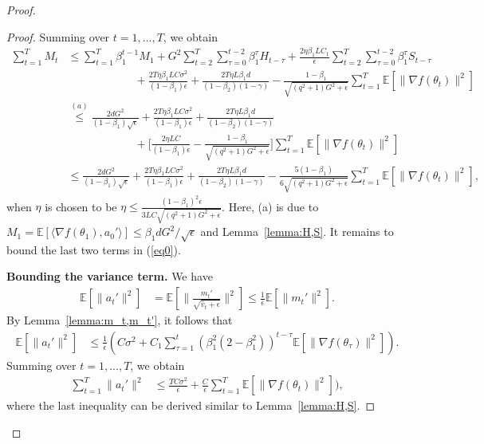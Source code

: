 \documentclass[11pt]{article}
\begin{document}
\begin{proof}
\begin{proof}
Summing over $t=1,...,T$, we obtain
\begin{align*}
    \sum_{t=1}^T M_t&\leq \sum_{t=1}^T \beta_1^{t-1} M_1+G^2\sum_{t=2}^T \sum_{\tau=0}^{t-2} \beta_1^\tau H_{t-\tau}+\frac{2\eta \beta_1 LC_1}{\epsilon}\sum_{t=2}^T\sum_{\tau=0}^{t-2}\beta_1^\tau S_{t-\tau}\\
    &\hspace{1in} +\frac{2T\eta \beta_1 LC\sigma^2}{(1-\beta_1)\epsilon}+\frac{2T\eta L\beta_1 d}{(1-\beta_2)(1-\gamma)}-\frac{1-\beta_1}{\sqrt{(q^2+1)G^2+\epsilon}}\sum_{t=1}^T \mathbb E[\|\nabla f(\theta_t)\|^2]\\
    &\overset{(a)}{\leq} \frac{2dG^2}{(1-\beta_1)\sqrt\epsilon}+\frac{2T\eta \beta_1 LC\sigma^2}{(1-\beta_1)\epsilon}+\frac{2T\eta L\beta_1 d}{(1-\beta_2)(1-\gamma)}\\
    &\hspace{1in} +\Big[\frac{2\eta L C}{(1-\beta_1)\epsilon}- \frac{1-\beta_1}{\sqrt{(q^2+1)G^2+\epsilon}}\Big]\sum_{t=1}^T \mathbb E[\|\nabla f(\theta_t)\|^2]\\
    &\leq \frac{2dG^2}{(1-\beta_1)\sqrt\epsilon}+\frac{2T\eta \beta_1 LC\sigma^2}{(1-\beta_1)\epsilon}+\frac{2T\eta L\beta_1 d}{(1-\beta_2)(1-\gamma)}- \frac{5(1-\beta_1)}{6\sqrt{(q^2+1)G^2+\epsilon}}\sum_{t=1}^T \mathbb E[\|\nabla f(\theta_t)\|^2],
\end{align*}
when $\eta$ is chosen to be $\eta\leq\frac{(1-\beta_1)^2\epsilon}{3LC\sqrt{(q^2+1)G^2+\epsilon}}$. Here, (a) is due to $M_1=\mathbb E[\langle\nabla f(\theta_1),a_0'\rangle]\leq \beta_1 d G^2/\sqrt{\epsilon}$ and Lemma~\ref{lemma:H,S}. It remains to bound the last two terms in (\ref{eq0}).

\textbf{Bounding the variance term.} We have
\begin{align*}
    \mathbb E[\|a_t'\|^2]&=\mathbb E[\|\frac{m_t'}{\sqrt{\hat v_t+\epsilon}}\|^2]\leq \frac{1}{\epsilon}\mathbb E[\|m_t'\|^2].
\end{align*}
By Lemma~\ref{lemma:m_t,m_t'}, it follows that
\begin{align*}
    \mathbb E[\|a_t'\|^2]&\leq \frac{1}{\epsilon}(C\sigma^2+C_1 \sum_{\tau=1}^t (\beta_1^2(2-\beta_1^2))^{t-\tau}\mathbb E[\|\nabla f(\theta_\tau)\|^2]).
\end{align*}
Summing over $t=1,...,T$, we obtain
\begin{align*}
    \sum_{t=1}^T \|a_t'\|^2&\leq \frac{TC\sigma^2}{\epsilon}+\frac{C}{\epsilon} \sum_{t=1}^T \mathbb E[\|\nabla f(\theta_t)\|^2]),
\end{align*}
where the last inequality can be derived similar to Lemma~\ref{lemma:H,S}.



\end{proof}
\end{proof}
\end{document}
